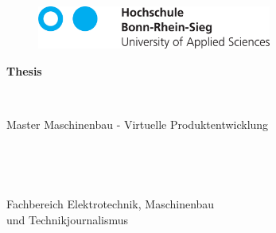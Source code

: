 \begin{titlepage}
	\begin{figure}[htbp]
		\includegraphics[height=1.4cm]{Kapitel/xx_Logo_HBRS_74mm_Pfade-eps-converted-to.pdf}
	\end{figure}
  \linespread{1.4}%
  \vspace{2cm}
  \begin{center}

    \begin{Huge}\textbf{Thesis}\end{Huge} \\
    \vspace{1.5cm}
    \begin{Large}{Master Maschinenbau - Virtuelle Produktentwicklung}\end{Large} \\

    \vspace{0.7cm}
    \linespread{1.2}%
    \begin{huge}
      \textbf{\Title}
    \end{huge}
    \linespread{1.5}%
    \normalsize
    \vspace{1cm}%

    \begin{Large}{\Author \\}
    \end{Large}

    \begin{Large}%
        Fachbereich Elektrotechnik, Maschinenbau \\ und Technikjournalismus
    \end{Large}
  \end{center}

\vspace*{\fill}


\end{titlepage}
